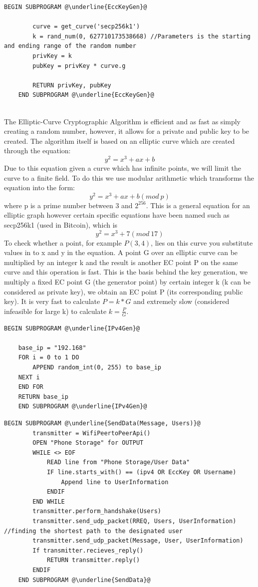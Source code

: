 \documentclass[a4paper, titlepage]{article}
\begin{document}
\begin{lstlisting}[caption=Elliptic-Curve Cryptographic (ECC) Key Generation, escapechar=\@]
	BEGIN SUBPROGRAM @\underline{EccKeyGen}@

		curve = get_curve('secp256k1')
		k = rand_num(0, 627710173538668) //Parameters is the starting and ending range of the random number
		privKey = k
		pubKey = privKey * curve.g 

		RETURN privKey, pubKey
	END SUBPROGRAM @\underline{EccKeyGen}@
			
\end{lstlisting}
The Elliptic-Curve Cryptographic Algorithm is efficient and as fast as simply creating a random number, however, it allows for a private and public key to be created. The algorithm itself is based on an elliptic curve which are created through the equation: \[ y^2 = x^3 + ax + b \] Due to this equation given a curve which has infinite points, we will limit the curve to a finite field. To do this we use modular arithmetic which transforms the equation into the form: \[ y^2 = x^3 + ax + b(mod\ p)\] where p is a prime number between $3$ and $2^{256}$. This is a general equation for an elliptic graph however certain specific equations have been named such as secp256k1 (used in Bitcoin), which is \[y^2 = x^3 + 7 (mod\ 17) \] To check whether a point, for example $P(3,4)$, lies on this curve you substitute values in to x and y in the equation. A point G over an elliptic curve can be multiplied by an integer k and the result is another EC point P on the same curve and this operation is fast. This is the basis behind the key generation, we multiply a fixed EC point G (the generator point) by certain integer k (k can be considered as private key), we obtain an EC point P (its corresponding public key). It is very fast to calculate $P = k * G$ and extremely slow (considered infeasible for large k) to calculate $k = \frac{P}{G}$.

\begin{lstlisting}[caption= IPv4 Creation, escapechar=\@]
	BEGIN SUBPROGRAM @\underline{IPv4Gen}@

	base_ip = "192.168"
	FOR i = 0 to 1 DO
		APPEND random_int(0, 255) to base_ip
	NEXT i
	END FOR
	RETURN base_ip			
	END SUBPROGRAM @\underline{IPv4Gen}@
\end{lstlisting}

\begin{lstlisting}[caption=Send Data Packets over Network, escapechar=\@]
	BEGIN SUBPROGRAM @\underline{SendData(Message, Users)}@
		transmitter = WifiPeertoPeerApi()
		OPEN "Phone Storage" for OUTPUT
		WHILE <> EOF
			READ line from "Phone Storage/User Data" 
			IF line.starts_with() == (ipv4 OR EccKey OR Username)
				Append line to UserInformation
			ENDIF
		END WHILE
		transmitter.perform_handshake(Users)
		transmitter.send_udp_packet(RREQ, Users, UserInformation) //finding the shortest path to the designated user
		transmitter.send_udp_packet(Message, User, UserInformation)
		If transmitter.recieves_reply() 
			RETURN transmitter.reply()
		ENDIF
	END SUBPROGRAM @\underline{SendData}@
			
\end{lstlisting}
\end{document}
